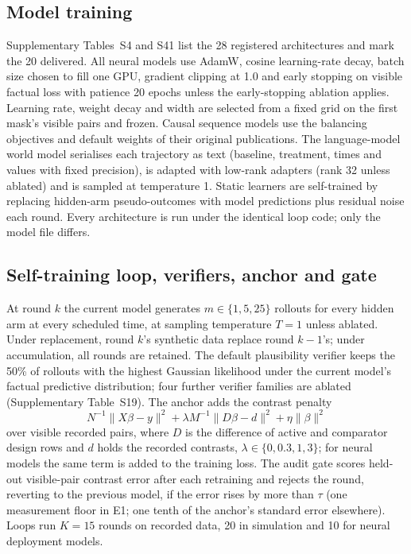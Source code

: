 \documentclass[11pt,a4paper]{article}
\begin{document}
\subsection{Model training}
Supplementary Tables~S4 and S41 list the 28 registered architectures and mark the 20 delivered. All neural models use AdamW, cosine learning-rate decay, batch size chosen to fill one GPU, gradient clipping at 1.0 and early stopping on visible factual loss with patience 20 epochs unless the early-stopping ablation applies. Learning rate, weight decay and width are selected from a fixed grid on the first mask's visible pairs and frozen. Causal sequence models use the balancing objectives and default weights of their original publications. The language-model world model serialises each trajectory as text (baseline, treatment, times and values with fixed precision), is adapted with low-rank adapters (rank 32 unless ablated) and is sampled at temperature 1. Static learners are self-trained by replacing hidden-arm pseudo-outcomes with model predictions plus residual noise each round. Every architecture is run under the identical loop code; only the model file differs.

\subsection{Self-training loop, verifiers, anchor and gate}
At round $k$ the current model generates $m\in\{1,5,25\}$ rollouts for every hidden arm at every scheduled time, at sampling temperature $T=1$ unless ablated. Under replacement, round $k$'s synthetic data replace round $k-1$'s; under accumulation, all rounds are retained. The default plausibility verifier keeps the 50\% of rollouts with the highest Gaussian likelihood under the current model's factual predictive distribution; four further verifier families are ablated (Supplementary Table~S19). The anchor adds the contrast penalty
\begin{equation}\label{eq:loss}
N^{-1}\|X\beta-y\|^2+\lambda M^{-1}\|D\beta-d\|^2+\eta\|\beta\|^2
\end{equation}
over visible recorded pairs, where $D$ is the difference of active and comparator design rows and $d$ holds the recorded contrasts, $\lambda\in\{0,0.3,1,3\}$; for neural models the same term is added to the training loss. The audit gate scores held-out visible-pair contrast error after each retraining and rejects the round, reverting to the previous model, if the error rises by more than $\tau$ (one measurement floor in E1; one tenth of the anchor's standard error elsewhere). Loops run $K=15$ rounds on recorded data, 20 in simulation and 10 for neural deployment models.
\end{document}
